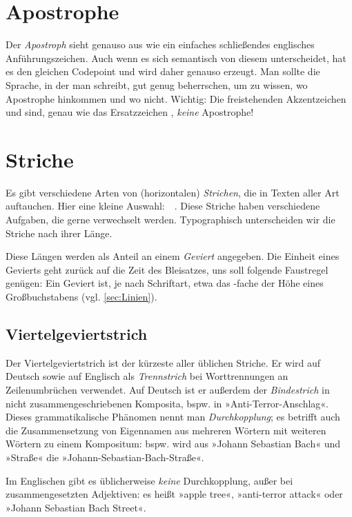 \section{Apostrophe}

Der \emph{Apostroph}  sieht genauso aus wie ein einfaches schließendes
englisches Anführungszeichen. Auch wenn es sich semantisch von diesem
unterscheidet, hat es den gleichen Codepoint und wird daher genauso erzeugt.
Man sollte die Sprache, in der man schreibt, gut genug beherrschen, um zu
wissen, wo Apostrophe hinkommen und wo nicht.  Wichtig: Die freistehenden
Akzentzeichen \Char{\textasciigrave} und  sind, genau wie das
Ersatzzeichen \Char{\textquotesingle}, \emph{keine} Apostrophe!

\section{Striche}

Es gibt verschiedene Arten von (horizontalen) \emph{Strichen}, die in Texten
aller Art auftauchen.  Hier eine kleine Auswahl:
\Char{-}\,\Char{--}\,\Char{---}\,\Char{$-$}\,\Char{$=$}.  Diese Striche haben
verschiedene Aufgaben, die gerne verwechselt werden.  Typographisch
unterscheiden wir die Striche nach ihrer Länge.

Diese Längen werden als Anteil an einem \emph{Geviert} angegeben. Die Einheit
eines Gevierts geht zurück auf die Zeit des Bleisatzes, uns soll folgende
Faustregel genügen: Ein Geviert ist, je nach Schriftart, etwa das -fache
der Höhe eines Großbuchstabens (vgl. \cref{sec:Linien}).

\subsection{Viertelgeviertstrich}
\label{subsec:Viertel}

Der Viertelgeviertstrich \Char{-} ist der kürzeste aller üblichen
Striche.  Er wird auf Deutsch sowie auf Englisch als \emph{Trennstrich} bei
Worttrennungen an Zeilenumbrüchen verwendet.  Auf Deutsch ist er außerdem der
\emph{Bindestrich} in nicht zusammenge\-schriebenen Komposita, bspw. in
»Anti-Terror-Anschlag«.  Dieses grammatikalische Phänomen nennt man
\emph{Durchkopplung}; es betrifft auch die Zusammensetzung von Eigennamen aus
mehreren Wörtern mit weiteren Wörtern zu einem Kompositum: bspw. wird aus
»Johann Sebastian Bach« und »Straße« die »Johann-Sebastian-Bach-Straße«.

Im Englischen gibt es üblicherweise \emph{keine} Durchkopplung, außer
bei zusammengesetzten Adjektiven: es heißt »apple tree«, »anti-terror
attack« oder »Johann Sebastian Bach Street«.

